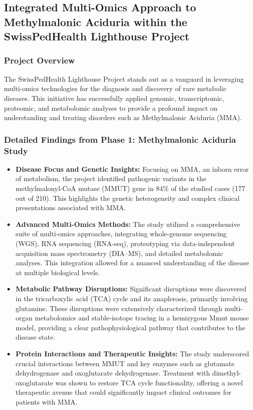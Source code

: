 
\subsection{Integrated Multi-Omics Approach to Methylmalonic Aciduria within the SwissPedHealth Lighthouse Project}

\subsubsection*{Project Overview}
The SwissPedHealth Lighthouse Project stands out as a vanguard in leveraging multi-omics technologies for the diagnosis and discovery of rare metabolic diseases. This initiative has successfully applied genomic, transcriptomic, proteomic, and metabolomic analyses to provide a profound impact on understanding and treating disorders such as Methylmalonic Aciduria (MMA).

\subsubsection*{Detailed Findings from Phase 1: Methylmalonic Aciduria Study}
\begin{itemize}
    \item \textbf{Disease Focus and Genetic Insights:} Focusing on MMA, an inborn error of metabolism, the project identified pathogenic variants in the methylmalonyl-CoA mutase (MMUT) gene in 84\% of the studied cases (177 out of 210). This highlights the genetic heterogeneity and complex clinical presentations associated with MMA.
    \item \textbf{Advanced Multi-Omics Methods:} The study utilized a comprehensive suite of multi-omics approaches, integrating whole-genome sequencing (WGS), RNA sequencing (RNA-seq), proteotyping via data-independent acquisition mass spectrometry (DIA–MS), and detailed metabolomic analyses. This integration allowed for a nuanced understanding of the disease at multiple biological levels.
    \item \textbf{Metabolic Pathway Disruptions:} Significant disruptions were discovered in the tricarboxylic acid (TCA) cycle and its anaplerosis, primarily involving glutamine. These disruptions were extensively characterized through multi-organ metabolomics and stable-isotope tracing in a hemizygous Mmut mouse model, providing a clear pathophysiological pathway that contributes to the disease state.
    \item \textbf{Protein Interactions and Therapeutic Insights:} The study underscored crucial interactions between MMUT and key enzymes such as glutamate dehydrogenase and oxoglutarate dehydrogenase. Treatment with dimethyl-oxoglutarate was shown to restore TCA cycle functionality, offering a novel therapeutic avenue that could significantly impact clinical outcomes for patients with MMA.
\end{itemize}

